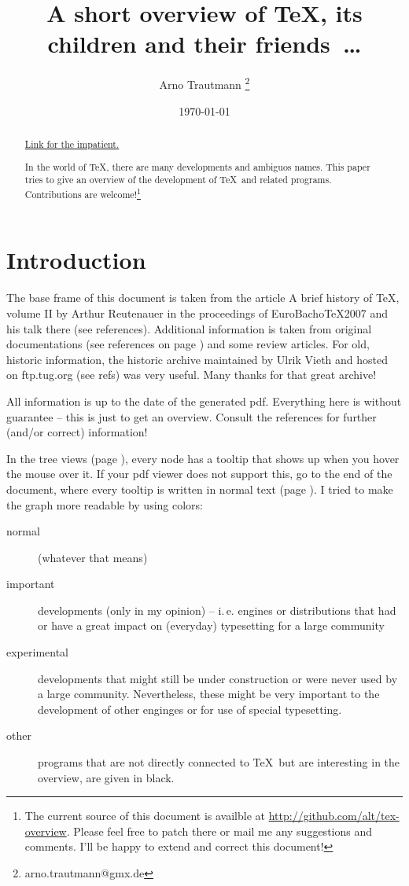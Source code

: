 \documentclass{scrartcl}
\title{A short overview of \TeX, its children and their friends~\dots}
\author{Arno Trautmann \thanks{arno.trautmann@gmx.de}}
\date{\today}
\begin{document}
\maketitle

\begin{abstract}
\centerline{\hyperref[textextview]{Link for the impatient.}}
In the world of \TeX, there are many developments and ambiguos names. This paper tries to give an overview of the development of \TeX\ and related programs. Contributions are welcome!\footnote{The current source of this document is availble at \url{http://github.com/alt/tex-overview}. Please feel free to patch there or mail me any suggestions and comments. I’ll be happy to extend and correct this document!}\\
\end{abstract}

\section*{Introduction}
The base frame of this document is taken from the article \textsf{A brief history of \TeX, volume II} by Arthur Reutenauer in the proceedings of \textsf{EuroBacho\TeX 2007} and his talk there (see references). Additional information is taken from original documentations (see references on page \pageref{sec:refs}) and some review articles. For old, historic information, the \textsf{historic archive} maintained by Ulrik Vieth and hosted on ftp.tug.org (see refs) was very useful. Many thanks for that great archive!

All information is up to the date of the generated pdf. Everything here is without guarantee – this is just to get an overview. Consult the references for further (and/or correct) information! 

In the tree views (page \pageref{sec:tree}), every node has a tooltip that shows up when you hover the mouse over it. If your pdf viewer does not support this, go to the end of the document, where every tooltip is written in normal text (page \pageref{sec:text}). I tried to make the graph more readable by using colors:

\begin{description}
\item[{\color{\normalimportant!70!black} normal}] (whatever that means)
\item[{\color{\vip!70!black} important}] developments (only in my opinion) – i.\,e. engines or distributions that had or have a great impact on (everyday) typesetting for a large community
\item[{\color{\experimental!70!black} experimental}] developments that might still be under construction or were never used by a large community. Nevertheless, these might be very important to the development of other enginges or for use of special typesetting.
\item[{\color{\other!70!black} other}] programs that are not directly connected to \TeX\ but are interesting in the overview, are given in black.
\end{description}
\end{document}
